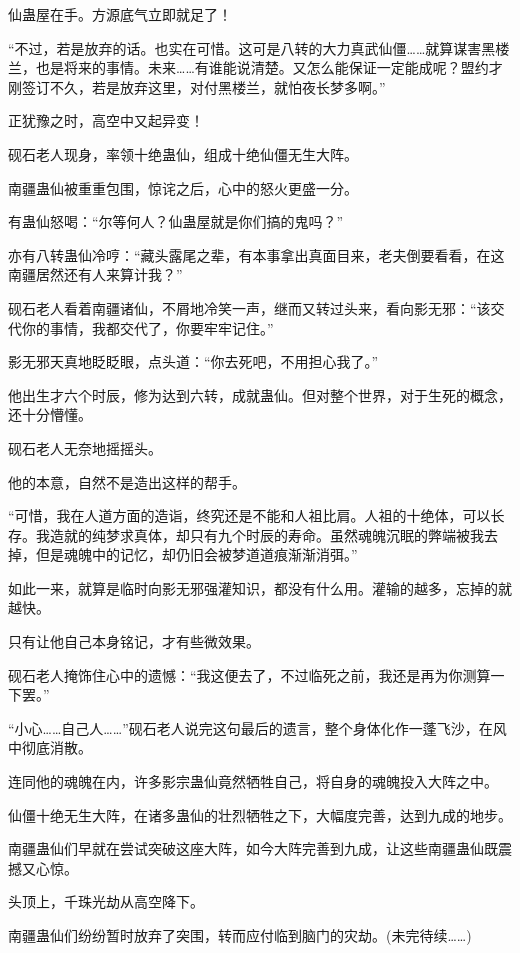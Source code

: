 \begin{this_body}
仙蛊屋在手。方源底气立即就足了！

“不过，若是放弃的话。也实在可惜。这可是八转的大力真武仙僵……就算谋害黑楼兰，也是将来的事情。未来……有谁能说清楚。又怎么能保证一定能成呢？盟约才刚签订不久，若是放弃这里，对付黑楼兰，就怕夜长梦多啊。”

正犹豫之时，高空中又起异变！

砚石老人现身，率领十绝蛊仙，组成十绝仙僵无生大阵。

南疆蛊仙被重重包围，惊诧之后，心中的怒火更盛一分。

有蛊仙怒喝：“尔等何人？仙蛊屋就是你们搞的鬼吗？”

亦有八转蛊仙冷哼：“藏头露尾之辈，有本事拿出真面目来，老夫倒要看看，在这南疆居然还有人来算计我？”

砚石老人看着南疆诸仙，不屑地冷笑一声，继而又转过头来，看向影无邪：“该交代你的事情，我都交代了，你要牢牢记住。”

影无邪天真地眨眨眼，点头道：“你去死吧，不用担心我了。”

他出生才六个时辰，修为达到六转，成就蛊仙。但对整个世界，对于生死的概念，还十分懵懂。

砚石老人无奈地摇摇头。

他的本意，自然不是造出这样的帮手。

“可惜，我在人道方面的造诣，终究还是不能和人祖比肩。人祖的十绝体，可以长存。我造就的纯梦求真体，却只有九个时辰的寿命。虽然魂魄沉眠的弊端被我去掉，但是魂魄中的记忆，却仍旧会被梦道道痕渐渐消弭。”

如此一来，就算是临时向影无邪强灌知识，都没有什么用。灌输的越多，忘掉的就越快。

只有让他自己本身铭记，才有些微效果。

砚石老人掩饰住心中的遗憾：“我这便去了，不过临死之前，我还是再为你测算一下罢。”

“小心……自己人……”砚石老人说完这句最后的遗言，整个身体化作一蓬飞沙，在风中彻底消散。

连同他的魂魄在内，许多影宗蛊仙竟然牺牲自己，将自身的魂魄投入大阵之中。

仙僵十绝无生大阵，在诸多蛊仙的壮烈牺牲之下，大幅度完善，达到九成的地步。

南疆蛊仙们早就在尝试突破这座大阵，如今大阵完善到九成，让这些南疆蛊仙既震撼又心惊。

头顶上，千珠光劫从高空降下。

南疆蛊仙们纷纷暂时放弃了突围，转而应付临到脑门的灾劫。(未完待续……)

\end{this_body}

